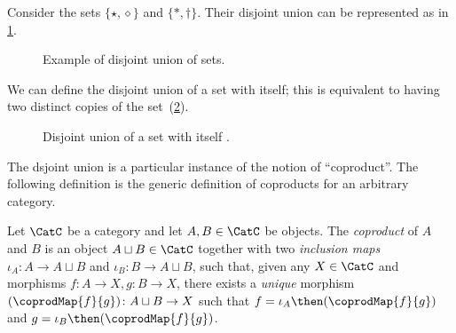 \begin{example}
Consider the sets $\{\star, \diamond\}$ and $\{\ast, \dagger\}$. Their disjoint union can be represented as in \cref{fig:disjoint}.
\begin{figure}[h!]
    \begin{center}
    \end{center}
    \caption{Example of disjoint union of sets. \label{fig:disjoint}}
\end{figure}
\end{example}


We can define the disjoint union of a set with itself; this is equivalent
to having two distinct copies of the set~(\cref{fig:disjointself}).

\begin{figure}[h!]
\begin{center}
    \caption{Disjoint union of a set with itself \label{fig:disjointself}.}
\end{center}
\end{figure}

The dsjoint union is a particular instance of the notion of ``coproduct''.
The following definition is the generic definition of coproducts for an arbitrary category.

\begin{shaded}
\begin{definition}[Coproduct]
Let $\CatC$ be a category and let $A, B \in \CatC$ be objects. The \emph{coproduct} of $A$ and $B$ is an object $A \sqcup B \in \CatC$ together with two \emph{inclusion maps} $\iota_A \colon A \to A \sqcup B $ and $\iota_B \colon B \to A  \sqcup B $, such that, given any $X \in \CatC$ and morphisms $f\colon  A \to X, g \colon B \to X$, there exists a \emph{unique} morphism $(\coprodMap{f}{g}) \colon A \sqcup B \to X$ such that $f = \iota_A\then (\coprodMap{f}{g})$ and $g = \iota_B \then (\coprodMap{f}{g})$.
\end{definition}
\end{shaded}

